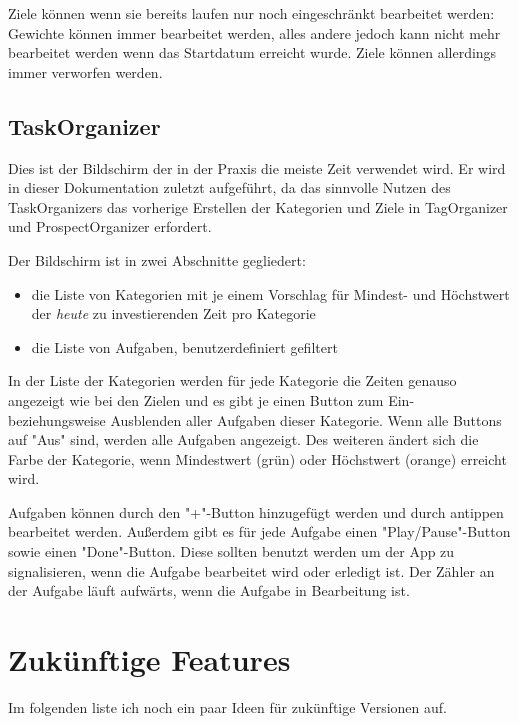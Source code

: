 \documentclass[10pt,a4paper]{article}
\begin{document}
Ziele können wenn sie bereits laufen nur noch eingeschränkt bearbeitet werden: Gewichte können immer bearbeitet werden, alles andere jedoch kann nicht mehr bearbeitet werden wenn das Startdatum erreicht wurde. Ziele können allerdings immer verworfen werden.

\subsection{TaskOrganizer}
Dies ist der Bildschirm der in der Praxis die meiste Zeit verwendet wird. Er wird in dieser Dokumentation zuletzt aufgeführt, da das sinnvolle Nutzen des TaskOrganizers das vorherige Erstellen der Kategorien und Ziele in TagOrganizer und ProspectOrganizer erfordert.

Der Bildschirm ist in zwei Abschnitte gegliedert:
\begin{itemize}
	\item die Liste von Kategorien mit je einem Vorschlag für Mindest- und Höchstwert der \textit{heute} zu investierenden Zeit pro Kategorie
	\item die Liste von Aufgaben, benutzerdefiniert gefiltert
\end{itemize}
In der Liste der Kategorien werden für jede Kategorie die Zeiten genauso angezeigt wie bei den Zielen und es gibt je einen Button zum Ein- beziehungsweise Ausblenden aller Aufgaben dieser Kategorie. Wenn alle Buttons auf "Aus" sind, werden alle Aufgaben angezeigt. Des weiteren ändert sich die Farbe der Kategorie, wenn Mindestwert (grün) oder Höchstwert (orange) erreicht wird. 

Aufgaben können durch den "+"-Button hinzugefügt werden und durch antippen bearbeitet werden. Außerdem gibt es für jede Aufgabe einen "Play/Pause"-Button sowie einen "Done"-Button. Diese sollten benutzt werden um der App zu signalisieren, wenn die Aufgabe bearbeitet wird oder erledigt ist. Der Zähler an der Aufgabe läuft aufwärts, wenn die Aufgabe in Bearbeitung ist.

\section{Zukünftige Features}
Im folgenden liste ich noch ein paar Ideen für zukünftige Versionen auf.
\end{document}
